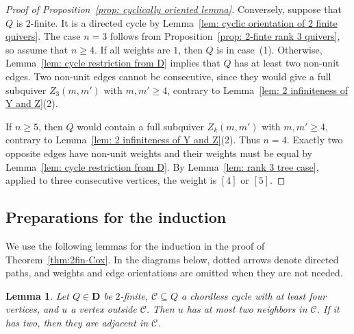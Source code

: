 \documentclass[11pt,reqno]{amsart}
\numberwithin{equation}{section}
\theoremstyle{definition}
\theoremstyle{plain}
\newtheorem{lemma}[example]{Lemma}
\newcommand{\D}{\mathbf{D}}
\newcommand{\bra}[1]{\left[#1\right]}
\begin{document}
\begin{proof}[Proof of Proposition~\ref{prop: cyclically oriented lemma}]
		Conversely, suppose that $Q$ is $2$-finite. It is a directed cycle by Lemma~\ref{lem: cyclic orientation of 2 finite quivers}. The case $n=3$ follows from Proposition~\ref{prop: 2-finte rank 3 quivers}, so assume that $n\geq4$. If all weights are $1$, then $Q$ is in case~(1). Otherwise, Lemma~\ref{lem: cycle restriction from D} implies that $Q$ has at least two non-unit edges. Two non-unit edges cannot be consecutive, since they would give a full subquiver $Z_3(m,m')$ with $m,m'\geq4$, contrary to Lemma~\ref{lem: 2 infiniteness of Y and Z}(2).
		
		If $n\geq5$, then $Q$ would contain a full subquiver $Z_k(m,m')$ with $m,m'\geq4$, contrary to Lemma~\ref{lem: 2 infiniteness of Y and Z}(2). Thus $n=4$. Exactly two opposite edges have non-unit weights and their weights must be equal by Lemma~\ref{lem: cycle restriction from D}. By Lemma~\ref{lem: rank 3 tree case}, applied to three consecutive vertices, the weight is $\bra{4}$ or $\bra{5}$.
	\end{proof}


\subsection{Preparations for the induction}
	We use the following lemmas for the induction in the proof of Theorem~\ref{thm:2fin-Cox}. In the diagrams below, dotted arrows denote directed paths, and weights and edge orientations are omitted when they are not needed.
	
	\begin{lemma}\label{lem:cycle-attachment}
		Let $Q\in\D$ be $2$-finite, $\mathcal C\subseteq Q$ a chordless cycle with at least four vertices, and $u$ a vertex outside $\mathcal C$. Then $u$ has at most two neighbors in $\mathcal C$. If it has two, then they are adjacent in $\mathcal C$.
	\end{lemma}
	
\end{document}
